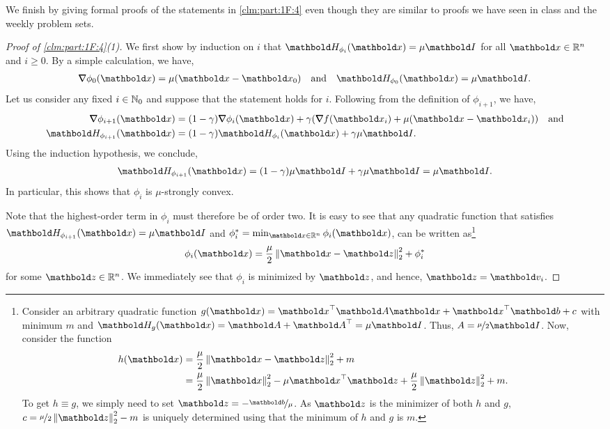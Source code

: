 \documentclass{tufte-handout}
\begin{document}
We finish by giving formal proofs of the statements in \cref{clm:part:1F:4} even though they are similar to proofs we have seen in class and the weekly problem sets.
\begin{proof}[Proof of \cref{clm:part:1F:4}(1)] We first show by induction on $i$ that $\mH_{\phi_i}(\vx) = \mu\mI$ for all $\vx \in \R^n$ and $i \geq 0$. By a simple calculation, we have, \begin{align*}
    \grad \phi_0(\vx) = \mu(\vx - \vx_0) \quad \text{and} \quad \mH_{\phi_0}(\vx) = \mu\mI.
\end{align*} Let us consider any fixed $i \in \mathbb{N}_0$ and suppose that the statement holds for $i$. Following from the definition of $\phi_{i+1}$, we have, \begin{align*}
    \grad \phi_{i+1}(\vx) &= (1-\gamma)\grad \phi_i(\vx) + \gamma\parentheses*{\grad f(\vx_i) + \mu(\vx - \vx_i)} \quad\text{and} \\
    \mH_{\phi_{i+1}}(\vx) &= (1-\gamma)\mH_{\phi_i}(\vx) + \gamma\mu\mI.
\end{align*} Using the induction hypothesis, we conclude, \begin{align*}
    \mH_{\phi_{i+1}}(\vx) = (1-\gamma)\mu\mI + \gamma\mu\mI = \mu\mI.
\end{align*} In particular, this shows that $\phi_i$ is $\mu$-strongly convex.

Note that the highest-order term in $\phi_i$ must therefore be of order two. It is easy to see that any quadratic function that satisfies $\mH_{\phi_{i+1}}(\vx) = \mu\mI$ and $\s{\phi_i} = \min_{\vx \in \R^n} \phi_i(\vx)$, can be written as\footnote{Consider an arbitrary quadratic function $g(\vx) = \trans{\vx}\mA\vx + \trans{\vx}\vb + c$ with minimum $m$ and $\mH_g(\vx) = \mA + \trans{\mA} = \mu\mI$. Thus, $A = \nicefrac{\mu}{2}\mI$. Now, consider the function \begin{align*}
    h(\vx) &= \frac{\mu}{2}\norm{\vx - \vz}_2^2 + m \\
    &= \frac{\mu}{2}\norm{\vx}_2^2 - \mu\trans{\vx}\vz + \frac{\mu}{2}\norm{\vz}_2^2 + m.
\end{align*} To get $h \equiv g$, we simply need to set $\vz = -\nicefrac{\vb}{\mu}$. As $\vz$ is the minimizer of both $h$ and $g$, $c = \nicefrac{\mu}{2}\norm{\vz}_2^2 - m$ is uniquely determined using that the minimum of $h$ and $g$ is $m$.} \begin{align*}
    \phi_i(\vx) = \frac{\mu}{2}\norm{\vx - \vz}_2^2 + \s{\phi_i}
\end{align*} for some $\vz \in \R^n$. We immediately see that $\phi_i$ is minimized by $\vz$, and hence, $\vz = \vv_i$.
\end{proof}
\end{document}
